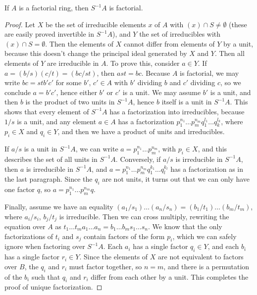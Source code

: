 \begin{prop}
    If $A$ is a factorial ring, then $S^{-1}A$ is factorial.
\end{prop}
\begin{proof}
    Let $X$ be the set of irreducible elements $x$ of $A$ with $(x) \cap S \neq \emptyset$ (these are easily proved invertible in $S^{-1}A$), and $Y$ the set of irreducibles with $(x) \cap S = \emptyset$. Then the elements of $X$ cannot differ from elements of $Y$ by a unit, because this doesn't change the principal ideal generated by $X$ and $Y$. Then all elements of $Y$ are irreducible in $A$. To prove this, consider $a \in Y$. If $a = (b/s)(c/t) = (bc/st)$, then $ast = bc$. Because $A$ is factorial, we may write $bc = stb'c'$ for some $b'$, $c' \in A$ with $b'$ dividing $b$ and $c'$ dividing $c$, so we conclude $a = b'c'$, hence either $b'$ or $c'$ is a unit. We may assume $b'$ is a unit, and then $b$ is the product of two units in $S^{-1}A$, hence $b$ itself is a unit in $S^{-1}A$. This shows that every element of $S^{-1}A$ has a factorization into irreducibles, because $1/s$ is a unit, and any element $a \in A$ has a factorization $p_1^{n_1} \dots p_m^{n_m} q_1^{l_1} \dots q_k^{l_k}$, where $p_i \in X$ and $q_i \in Y$, and then we have a product of units and irreducibles.

    If $a/s$ is a unit in $S^{-1}A$, we can write $a = p_1^{n_1} \dots p_m^{n_m}$, with $p_i \in X$, and this describes the set of all units in $S^{-1}A$. Conversely, if $a/s$ is irreducible in $S^{-1}A$, then $a$ is irreducible in $S^{-1}A$, and $a = p_1^{n_1} \dots p_m^{n_m} q_1^{k_1} \dots q_l^{k_l}$ has a factorization as in the last paragraph. Since the $q_i$ are not units, it turns out that we can only have one factor $q$, so $a = p_1^{n_1} \dots p_m^{n_m} q$.

    Finally, assume we have an equality $(a_1/s_1) \dots (a_n/s_n) = (b_1/t_1) \dots (b_m/t_m)$, where $a_i/s_i$, $b_j/t_j$ is irreducible. Then we can cross multiply, rewriting the equation over $A$ as $t_1 \dots t_m a_1 \dots a_n = b_1 \dots b_m s_1 \dots s_n$. We know that the only factorizations of $t_i$ and $s_j$ contain factors of the form $p_i$, which we can safely ignore when factoring over $S^{-1}A$. Each $a_i$ has a single factor $q_i \in Y$, and each $b_i$ has a single factor $r_i \in Y$. Since the elements of $X$ are not equivalent to factors over $B$, the $q_i$ and $r_i$ must factor together, so $n = m$, and there is a permutation of the $b_i$ such that $q_i$ and $r_i$ differ from each other by a unit. This completes the proof of unique factorization.
\end{proof}

